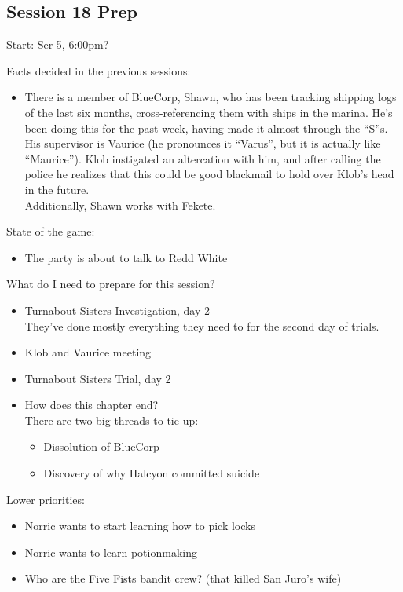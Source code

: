 \subsection{Session 18 Prep}
Start: Ser 5, 6:00pm?

Facts decided in the previous sessions:
\begin{itemize}
\item There is a member of BlueCorp, Shawn, who has been tracking shipping logs of the last six months, cross-referencing them with ships in the marina. He's been doing this for the past week, having made it almost through the ``S''s. His supervisor is Vaurice (he pronounces it ``Varus'', but it is actually like ``Maurice''). Klob instigated an altercation with him, and after calling the police he realizes that this could be good blackmail to hold over Klob's head in the future.\\
Additionally, Shawn works with Fekete.
\end{itemize}

State of the game:
\begin{itemize}
\item The party is about to talk to Redd White
\end{itemize}

What do I need to prepare for this session?
\begin{itemize}
\item Turnabout Sisters Investigation, day 2\\
They've done mostly everything they need to for the second day of trials. 
\item Klob and Vaurice meeting
\item Turnabout Sisters Trial, day 2
\item How does this chapter end?\\
There are two big threads to tie up:
\begin{itemize}
 \item Dissolution of BlueCorp
 \item Discovery of why Halcyon committed suicide
\end{itemize}
\end{itemize}

Lower priorities:
\begin{itemize}
\item Norric wants to start learning how to pick locks
\item Norric wants to learn potionmaking
\item Who are the Five Fists bandit crew? (that killed San Juro's wife)
\end{itemize}



